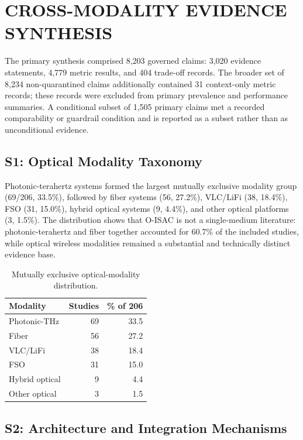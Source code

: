 \section{CROSS-MODALITY EVIDENCE SYNTHESIS}
\label{sec:full_corpus_synthesis}

The primary synthesis comprised 8,203 governed claims: 3,020 evidence
statements, 4,779 metric results, and 404 trade-off records. The broader set of
8,234 non-quarantined claims additionally contained 31 context-only metric
records; these records were excluded from primary prevalence and performance
summaries. A conditional subset of 1,505 primary claims met a recorded
comparability or guardrail condition and is reported as a subset rather than
as unconditional evidence.

\subsection{S1: Optical Modality Taxonomy}

Photonic-terahertz systems formed the largest mutually exclusive modality
group (69/206, 33.5\%), followed by fiber systems (56, 27.2\%), VLC/LiFi (38,
18.4\%), FSO (31, 15.0\%), hybrid optical systems (9, 4.4\%), and other optical
platforms (3, 1.5\%). The distribution shows that O-ISAC is not a single-medium
literature: photonic-terahertz and fiber together accounted for 60.7\% of the
included studies, while optical wireless modalities remained a substantial
and technically distinct evidence base.

\begin{table}[!t]
\caption{Mutually exclusive optical-modality distribution.}
\label{tab:s1_modality}
\centering
\begin{tabular}{lrr}
\toprule
\textbf{Modality} & \textbf{Studies} & \textbf{\% of 206} \\
\midrule
Photonic-THz & 69 & 33.5 \\
Fiber & 56 & 27.2 \\
VLC/LiFi & 38 & 18.4 \\
FSO & 31 & 15.0 \\
Hybrid optical & 9 & 4.4 \\
Other optical & 3 & 1.5 \\
\bottomrule
\end{tabular}
\end{table}

\subsection{S2: Architecture and Integration Mechanisms}

